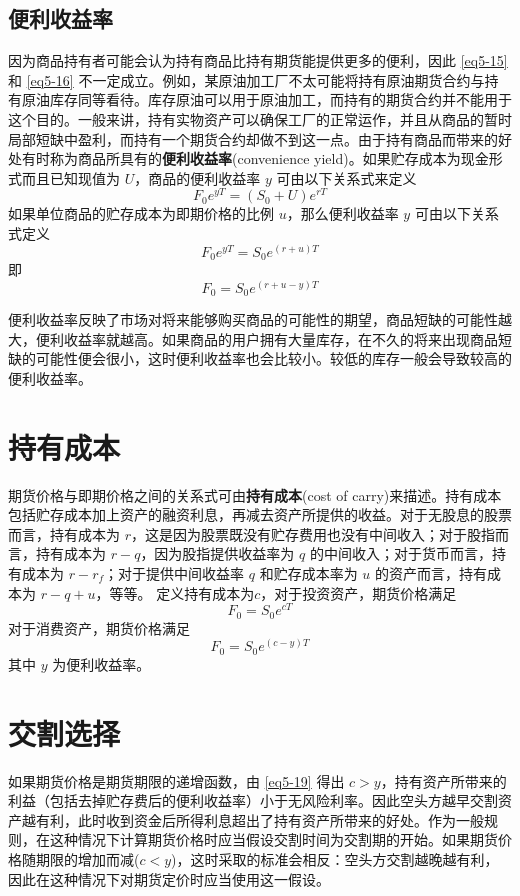 \subsection{便利收益率}
因为商品持有者可能会认为持有商品比持有期货能提供更多的便利，因此 \autoref{eq5-15} 和 \autoref{eq5-16} 不一定成立。例如，某原油加工厂不太可能将持有原油期货合约与持有原油库存同等看待。库存原油可以用于原油加工，而持有的期货合约并不能用于这个目的。一般来讲，持有实物资产可以确保工厂的正常运作，并且从商品的暂时局部短缺中盈利，而持有一个期货合约却做不到这一点。由于持有商品而带来的好处有时称为商品所具有的\textbf{便利收益率}(convenience yield)。如果贮存成本为现金形式而且已知现值为 $U$，商品的便利收益率 $y$ 可由以下关系式来定义
$$F_0e^{yT}=(S_0+U)e^{rT}$$
如果单位商品的贮存成本为即期价格的比例 $u$，那么便利收益率 $y$ 可由以下关系式定义
$$F_0e^{yT}=S_0e^{(r+u)T}$$
即
\begin{equation}\label{eq5-17}
    F_0=S_0e^{(r+u-y)T}
\end{equation}

便利收益率反映了市场对将来能够购买商品的可能性的期望，商品短缺的可能性越大，便利收益率就越高。如果商品的用户拥有大量库存，在不久的将来出现商品短缺的可能性便会很小，这时便利收益率也会比较小。较低的库存一般会导致较高的便利收益率。
\section{持有成本}
期货价格与即期价格之间的关系式可由\textbf{持有成本}(cost of carry)来描述。持有成本包括贮存成本加上资产的融资利息，再减去资产所提供的收益。对于无股息的股票而言，持有成本为 $r$，这是因为股票既没有贮存费用也没有中间收入；对于股指而言，持有成本为 $r-q$，因为股指提供收益率为 $q$ 的中间收入；对于货币而言，持有成本为 $r-r_f$；对于提供中间收益率 $q$ 和贮存成本率为 $u$ 的资产而言，持有成本为 $r-q+u$，等等。
定义持有成本为$c$，对于投资资产，期货价格满足
\begin{equation}\label{eq5-18}
    F_0=S_0e^{cT}
\end{equation}
对于消费资产，期货价格满足
\begin{equation}\label{eq5-19}
    F_0=S_0e^{(c-y)T}
\end{equation}
其中 $y$ 为便利收益率。
\section{交割选择}
如果期货价格是期货期限的递增函数，由 \autoref{eq5-19} 得出 $c>y$，持有资产所带来的利益（包括去掉贮存费后的便利收益率）小于无风险利率。因此空头方越早交割资产越有利，此时收到资金后所得利息超出了持有资产所带来的好处。作为一般规则，在这种情况下计算期货价格时应当假设交割时间为交割期的开始。如果期货价格随期限的增加而减($c<y$)，这时采取的标准会相反：空头方交割越晚越有利，因此在这种情况下对期货定价时应当使用这一假设。
